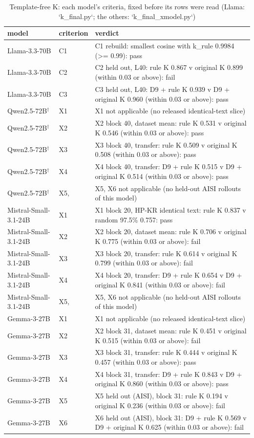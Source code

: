\begin{table}
\caption{Template-free K: each model's criteria, fixed before its rows were read (Llama: `k_final.py`; the others: `k_final_xmodel.py`)}
\label{tab:x-rule_k_verdicts}
\begin{tabular}{lll}
\toprule
model & criterion & verdict \\
\midrule
Llama-3.3-70B & C1 & C1 rebuild: smallest cosine with k\_rule 0.9984 (>= 0.99): pass \\
Llama-3.3-70B & C2 & C2 held out, L40: rule K 0.867 v original K 0.899 (within 0.03 or above): fail \\
Llama-3.3-70B & C3 & C3 held out, L40: D9 + rule K 0.939 v D9 + original K 0.960 (within 0.03 or above): pass \\
Qwen2.5-72B$^\dagger$ & X1 & X1 not applicable (no released identical-text slice) \\
Qwen2.5-72B$^\dagger$ & X2 & X2 block 40, dataset mean: rule K 0.531 v original K 0.546 (within 0.03 or above): pass \\
Qwen2.5-72B$^\dagger$ & X3 & X3 block 40, transfer: rule K 0.509 v original K 0.508 (within 0.03 or above): pass \\
Qwen2.5-72B$^\dagger$ & X4 & X4 block 40, transfer: D9 + rule K 0.515 v D9 + original K 0.514 (within 0.03 or above): pass \\
Qwen2.5-72B$^\dagger$ & X5, & X5, X6 not applicable (no held-out AISI rollouts of this model) \\
Mistral-Small-3.1-24B & X1 & X1 block 20, HP-KR identical text: rule K 0.837 v random 97.5\% 0.757: pass \\
Mistral-Small-3.1-24B & X2 & X2 block 20, dataset mean: rule K 0.706 v original K 0.775 (within 0.03 or above): fail \\
Mistral-Small-3.1-24B & X3 & X3 block 20, transfer: rule K 0.614 v original K 0.799 (within 0.03 or above): fail \\
Mistral-Small-3.1-24B & X4 & X4 block 20, transfer: D9 + rule K 0.654 v D9 + original K 0.841 (within 0.03 or above): fail \\
Mistral-Small-3.1-24B & X5, & X5, X6 not applicable (no held-out AISI rollouts of this model) \\
Gemma-3-27B & X1 & X1 not applicable (no released identical-text slice) \\
Gemma-3-27B & X2 & X2 block 31, dataset mean: rule K 0.451 v original K 0.515 (within 0.03 or above): fail \\
Gemma-3-27B & X3 & X3 block 31, transfer: rule K 0.444 v original K 0.457 (within 0.03 or above): pass \\
Gemma-3-27B & X4 & X4 block 31, transfer: D9 + rule K 0.843 v D9 + original K 0.860 (within 0.03 or above): pass \\
Gemma-3-27B & X5 & X5 held out (AISI), block 31: rule K 0.194 v original K 0.236 (within 0.03 or above): fail \\
Gemma-3-27B & X6 & X6 held out (AISI), block 31: D9 + rule K 0.569 v D9 + original K 0.625 (within 0.03 or above): fail \\
\bottomrule
\end{tabular}
\end{table}
